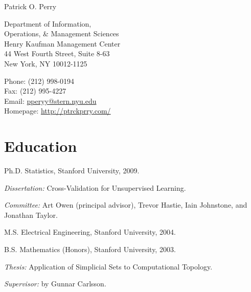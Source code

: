 \documentclass[10pt,letterpaper]{article}
\def\name{Patrick O. Perry}
\renewenvironment{itemize}{
  \begin{list}{}{
    \setlength{\leftmargin}{1.5em}
    \setlength{\itemsep}{0.25em}
    \setlength{\parskip}{0pt}
    \setlength{\parsep}{0.25em}
  }
}{
  \end{list}
}
\begin{document}
{\huge \name}


\bigskip

\begin{minipage}[t]{0.5\textwidth}
  Department of Information, \\
  Operations, \& Management Sciences \\
  Henry Kaufman Management Center \\
  44 West Fourth Street, Suite 8-63 \\
  New York, NY 10012-1125
\end{minipage}
\begin{minipage}[t]{0.5\textwidth}
  Phone: (212) 998-0194 \\
  Fax: (212) 995-4227 \\
  Email: \href{mailto:pperry@stern.nyu.edu}{pperyy@stern.nyu.edu} \\
  Homepage: \href{http://ptrckprry.com/}{http://ptrckprry.com/}
\end{minipage}

\section*{Education}

\begin{itemize}
  \item Ph.D. Statistics, Stanford University, 2009.
    \begin{itemize}
    \item \textit{Dissertation:}
      Cross-Validation for Unsupervised Learning.
    \item \textit{Committee:}
      Art Owen (principal advisor), Trevor Hastie,
      Iain Johnstone, and Jonathan Taylor.
    \end{itemize}
  \item M.S. Electrical Engineering, Stanford University, 2004.
  \item B.S. Mathematics (Honors),
    Stanford University, 2003.
    \begin{itemize}
    \item \textit{Thesis:}
      Application of Simplicial Sets to Computational Topology.
    \item \textit{Supervisor:} by Gunnar Carlsson.
    \end{itemize}
\end{itemize}
\end{document}
